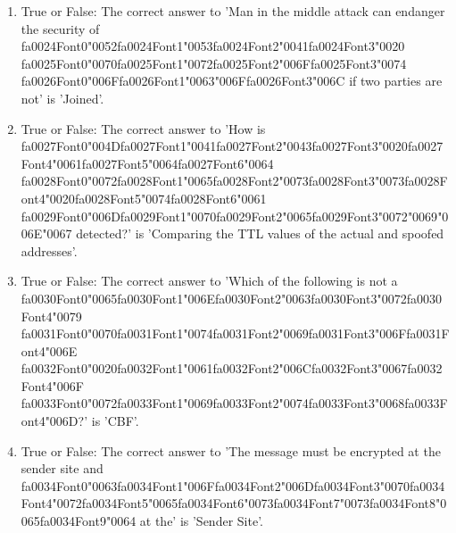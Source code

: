 \documentclass[12pt]{article}
\begin{document}
\begin{enumerate}[label=\arabic*.]
\item True or False: The correct answer to 'Man in the middle attack can endanger the security of {\csname fa0024Font0\endcsname\char"0052}{\csname fa0024Font1\endcsname\char"0053}{\csname fa0024Font2\endcsname\char"0041}{\csname fa0024Font3\endcsname\char"0020} {\csname fa0025Font0\endcsname\char"0070}{\csname fa0025Font1\endcsname\char"0072}{\csname fa0025Font2\endcsname\char"006F}{\csname fa0025Font3\endcsname\char"0074} {\csname fa0026Font0\endcsname\char"006F}{\csname fa0026Font1\endcsname\char"0063}{\char"006F}{\csname fa0026Font3\endcsname\char"006C} if two parties are not' is 'Joined'.
\item True or False: The correct answer to 'How is {\csname fa0027Font0\endcsname\char"004D}{\csname fa0027Font1\endcsname\char"0041}{\csname fa0027Font2\endcsname\char"0043}{\csname fa0027Font3\endcsname\char"0020}{\csname fa0027Font4\endcsname\char"0061}{\csname fa0027Font5\endcsname\char"0064}{\csname fa0027Font6\endcsname\char"0064} {\csname fa0028Font0\endcsname\char"0072}{\csname fa0028Font1\endcsname\char"0065}{\csname fa0028Font2\endcsname\char"0073}{\csname fa0028Font3\endcsname\char"0073}{\csname fa0028Font4\endcsname\char"0020}{\csname fa0028Font5\endcsname\char"0074}{\csname fa0028Font6\endcsname\char"0061} {\csname fa0029Font0\endcsname\char"006D}{\csname fa0029Font1\endcsname\char"0070}{\csname fa0029Font2\endcsname\char"0065}{\csname fa0029Font3\endcsname\char"0072}{\char"0069}{\char"006E}{\char"0067} detected?' is 'Comparing the TTL values of the actual and spoofed addresses'.
\item True or False: The correct answer to 'Which of the following is not a {\csname fa0030Font0\endcsname\char"0065}{\csname fa0030Font1\endcsname\char"006E}{\csname fa0030Font2\endcsname\char"0063}{\csname fa0030Font3\endcsname\char"0072}{\csname fa0030Font4\endcsname\char"0079} {\csname fa0031Font0\endcsname\char"0070}{\csname fa0031Font1\endcsname\char"0074}{\csname fa0031Font2\endcsname\char"0069}{\csname fa0031Font3\endcsname\char"006F}{\csname fa0031Font4\endcsname\char"006E} {\csname fa0032Font0\endcsname\char"0020}{\csname fa0032Font1\endcsname\char"0061}{\csname fa0032Font2\endcsname\char"006C}{\csname fa0032Font3\endcsname\char"0067}{\csname fa0032Font4\endcsname\char"006F} {\csname fa0033Font0\endcsname\char"0072}{\csname fa0033Font1\endcsname\char"0069}{\csname fa0033Font2\endcsname\char"0074}{\csname fa0033Font3\endcsname\char"0068}{\csname fa0033Font4\endcsname\char"006D}?' is 'CBF'.
\item True or False: The correct answer to 'The message must be encrypted at the sender site and {\csname fa0034Font0\endcsname\char"0063}{\csname fa0034Font1\endcsname\char"006F}{\csname fa0034Font2\endcsname\char"006D}{\csname fa0034Font3\endcsname\char"0070}{\csname fa0034Font4\endcsname\char"0072}{\csname fa0034Font5\endcsname\char"0065}{\csname fa0034Font6\endcsname\char"0073}{\csname fa0034Font7\endcsname\char"0073}{\csname fa0034Font8\endcsname\char"0065}{\csname fa0034Font9\endcsname\char"0064} at the' is 'Sender Site'.

\end{enumerate}
\end{document}

